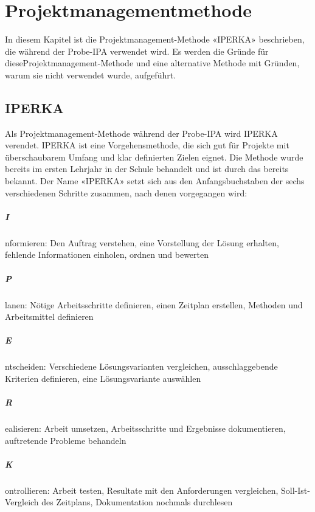 \chapter{Projektmanagementmethode}\label{ch:projektmanagementmethode}
In diesem Kapitel ist die Projektmanagement-Methode «IPERKA» beschrieben, die während der Probe-IPA verwendet wird. Es werden die Gründe für diese\newline Projektmanagement-Methode und eine alternative Methode mit Gründen, warum sie nicht verwendet wurde, aufgeführt.

\section{IPERKA}\label{sec:METHODE}
Als Projektmanagement-Methode während der Probe-IPA wird IPERKA verendet. IPERKA ist eine Vorgehensmethode, die sich gut für Projekte mit überschaubarem Umfang und klar definierten Zielen eignet. Die Methode wurde bereits im ersten Lehrjahr in der Schule behandelt und ist durch das bereits bekannt. Der Name «IPERKA» setzt sich aus den Anfangsbuchstaben der sechs verschiedenen Schritte zusammen, nach denen vorgegangen wird:

\paragraph{I} nformieren: Den Auftrag verstehen, eine Vorstellung der Lösung erhalten, fehlende Informationen einholen, ordnen und bewerten
\paragraph{P} lanen: Nötige Arbeitsschritte definieren, einen Zeitplan erstellen, Methoden und Arbeitsmittel definieren
\paragraph{E} ntscheiden: Verschiedene Lösungsvarianten vergleichen, ausschlaggebende Kriterien definieren, eine Lösungsvariante auswählen
\paragraph{R} ealisieren: Arbeit umsetzen, Arbeitsschritte und Ergebnisse dokumentieren, auftretende Probleme behandeln
\paragraph{K} ontrollieren: Arbeit testen, Resultate mit den Anforderungen vergleichen, Soll-Ist-Vergleich des Zeitplans, Dokumentation nochmals durchlesen
